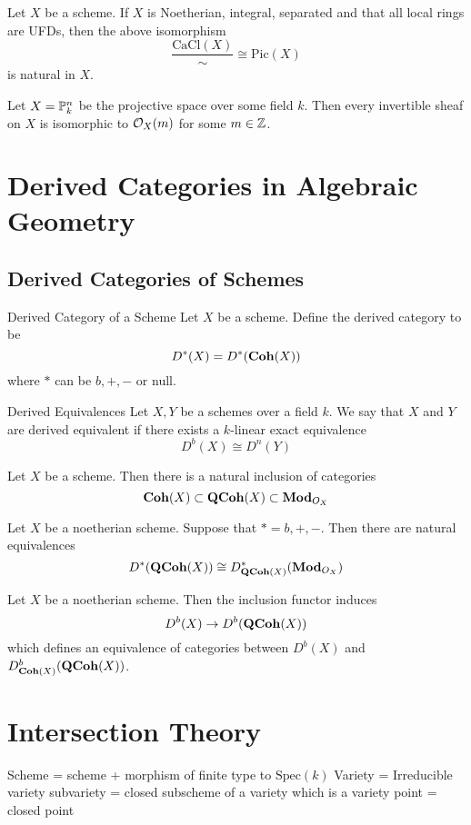 \documentclass[a4paper]{article}
\begin{document}
\begin{crl}{}{} Let $X$ be a scheme. If $X$ is Noetherian, integral, separated and that all local rings are UFDs, then the above isomorphism $$\frac{\text{CaCl}(X)}{\sim}\cong\text{Pic}(X)$$ is natural in $X$. 
\end{crl}

\begin{crl}{}{} Let $X=\mathbb{P}_k^n$ be the projective space over some field $k$. Then every invertible sheaf on $X$ is isomorphic to $\mathcal{O}_X(m)$ for some $m\in\mathbb{Z}$. 
\end{crl}

\pagebreak
\section{Derived Categories in Algebraic Geometry}
\subsection{Derived Categories of Schemes}
\begin{defn}{Derived Category of a Scheme}{} Let $X$ be a scheme. Define the derived category to be $$D^\ast(X)=D^\ast(\bold{Coh}(X))$$ where $\ast$ can be $b,+,-$ or null. 
\end{defn}

\begin{defn}{Derived Equivalences}{} Let $X,Y$ be a schemes over a field $k$. We say that $X$ and $Y$ are derived equivalent if there exists a $k$-linear exact equivalence $$D^b(X)\cong D^n(Y)$$
\end{defn}

Let $X$ be a scheme. Then there is a natural inclusion of categories $$\bold{Coh}(X)\subset\bold{QCoh}(X)\subset\bold{Mod}_{O_X}$$

\begin{prp}{}{} Let $X$ be a noetherian scheme. Suppose that $\ast=b,+,-$. Then there are natural equivalences $$D^\ast(\bold{QCoh}(X))\cong D_{\bold{QCoh}(X)}^\ast(\bold{Mod}_{O_X})$$
\end{prp}

\begin{prp}{}{} Let $X$ be a noetherian scheme. Then the inclusion functor induces $$D^b(X)\to D^b(\bold{QCoh}(X))$$ which defines an equivalence of categories between $D^b(X)$ and $D_{\bold{Coh}(X)}^b(\bold{QCoh}(X))$. 
\end{prp}

\pagebreak
\section{Intersection Theory}
Scheme = scheme + morphism of finite type to $\text{Spec}(k)$
Variety = Irreducible variety
subvariety = closed subscheme of a variety which is a variety
point = closed point
\end{document}
